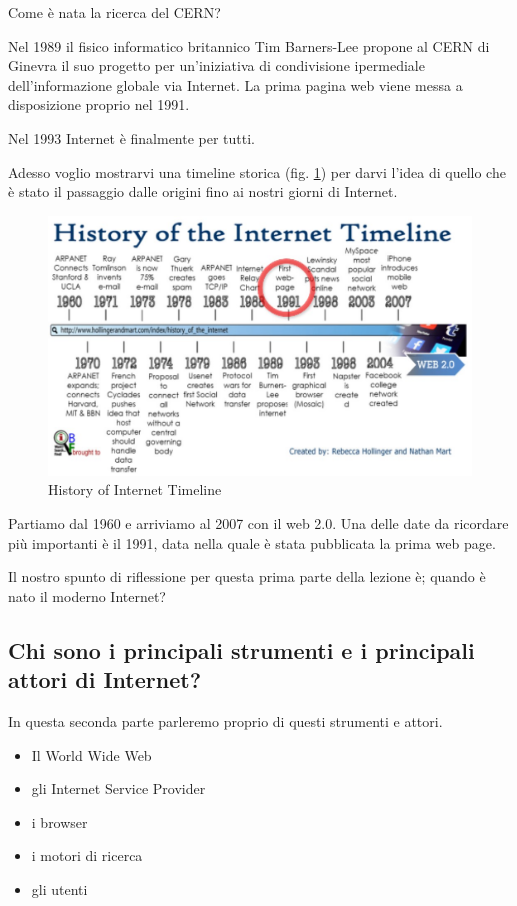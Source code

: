 Come è nata la  ricerca del CERN?

Nel 1989 il fisico informatico britannico Tim Barners-Lee propone al CERN di Ginevra il suo progetto per un'iniziativa di condivisione ipermediale dell'informazione globale via Internet. La prima pagina web viene messa a disposizione proprio nel 1991. 

Nel 1993 Internet è finalmente per tutti. 

Adesso voglio mostrarvi una timeline storica (fig. \ref{fig: Internet Timeline}) per darvi l'idea di quello che è stato il passaggio dalle origini fino ai nostri giorni di Internet. 

\begin{figure}[ht]
    \centering
    \includegraphics[width=0.9\linewidth]{images/03_lez_fig_01.jpg}
    \caption{History of Internet Timeline}
    \label{fig: Internet Timeline}
\end{figure}

Partiamo dal 1960 e arriviamo al 2007 con il web 2.0. 
Una delle date da ricordare più importanti è il 1991, data nella quale è stata pubblicata la prima web page.

Il nostro spunto di riflessione per questa prima parte della lezione è; quando è nato il moderno Internet? 

\subsection{Chi sono i principali strumenti e i principali attori di Internet?}

In questa seconda parte parleremo proprio di questi strumenti e attori. \par

\begin{itemize}
    \item Il World Wide Web
    \item gli Internet Service Provider
    \item i browser
    \item i motori di ricerca
    \item gli utenti
\end{itemize}

